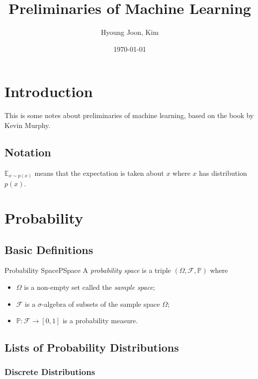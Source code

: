 \documentclass{report}
\title{Preliminaries of Machine Learning}
\author{Hyoung Joon, Kim}
\date{\today}
\begin{document}
\maketitle
\tableofcontents
\newpage

\chapter{Introduction}

This is some notes about preliminaries of machine learning, based on the book by Kevin Murphy.

    \section{Notation}
    $\mathbb{E}_{x \sim p(x)}$ means that the expectation is taken about $x$ where $x$ has distribution $p(x)$.

\chapter{Probability}
\section{Basic Definitions}


\begin{defn}{Probability Space}{PSpace}
    A \emph{probability space} is a triple \(( \Omega, \mathcal{F}, \mathbb{P})\) where
    \begin{itemize}
        \item \(\Omega\) is a non-empty set called the \emph{sample space};
        \item \(\mathcal{F}\) is a \(\sigma\)-algebra of subsets of the sample space \(\Omega\);
        \item \(\mathbb{P} :\mathcal{F} \to [0, 1]\) is a probability measure.
    \end{itemize}
\end{defn}

\section{Lists of Probability Distributions}

\subsection{Discrete Distributions}
\end{document}
